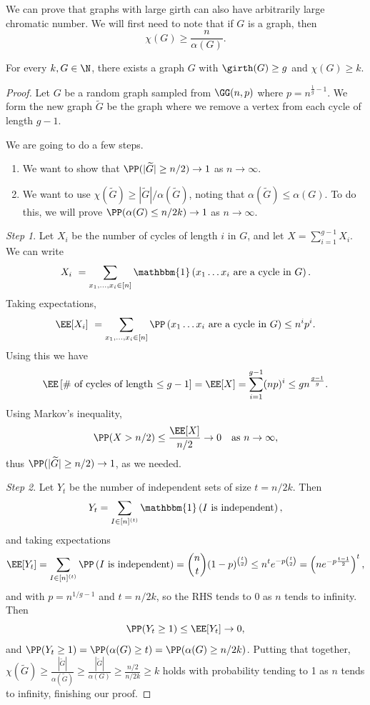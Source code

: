 We can prove that graphs with large girth can also have arbitrarily large chromatic number. We will first need to note that if $G$ is a graph, then
$$
\chi(G) \geq \frac{n}{\alpha(G)}.
$$

\begin{theorem}
	For every $k, G \in \N$, there exists a graph $G$ with $\girth(G) \geq g$ and $\chi(G) \geq k$.
\end{theorem} 
\begin{proof}
	Let $G$ be a random graph sampled from $\GG(n, p)$ where $p = n^{\frac{1}{g} - 1}$. We form the new graph $\widetilde{G}$ be the graph where we remove a vertex from each cycle of length $g - 1$.

	We are going to do a few steps.
	\begin{enumerate}
		\item We want to show that $\PP(|\widetilde{G}| \geq n/2) \rightarrow 1$ as $n \rightarrow \infty$.
		\item We want to use $\chi(\widetilde{G}) \geq |\widetilde{G}|/\alpha(\widetilde{G})$, noting that $\alpha(\widetilde{G}) \leq \alpha(G)$. To do this, we will prove $\PP(\alpha(G) \leq n/2k) \rightarrow 1$ as $n \rightarrow \infty$.
	\end{enumerate}

	\emph{Step 1}. Let $X_i$ be the number of cycles of length $i$ in $G$, and let $X = \sum_{i = 1}^{g - 1} X_i$. We can write
	\begin{align*}
		X_i \ = \sum_{x_1, \dots, x_i \in [n]} \mathbbm{1}\left(x_1 \dots x_i \text{ are a cycle in $G$}\right).
	\end{align*}
	Taking expectations,
	$$
\EE[X_i]\ = \sum_{x_1, \dots, x_i \in [n]} \PP\left(x_1 \dots x_i \text{ are a cycle in $G$}\right) \leq n^i p^i.
	$$
	Using this we have
	$$
	\EE\left[\#\text{ of cycles of length $\leq g - 1$}\right] = \EE[X] = \sum_{i = 1}^{g - 1} (np)^i \leq gn^{\frac{g - 1}{g}}.
	$$
Using Markov's inequality, 
$$
\PP(X > n/2) \leq \frac{\EE[X]}{n/2} \rightarrow 0 \quad \text{as }n \rightarrow \infty,
$$
thus $\PP(|\widetilde{G}| \geq n/2) \rightarrow 1$, as we needed.

\emph{Step 2}. Let $Y_t$ be the number of independent sets of size $t = n/2k$. Then
$$
Y_t = \sum_{I \in [n]^{(t)}} \mathbbm{1}\left(\text{$I$ is independent}\right),
$$
and taking expectations
$$
\EE[Y_t] = \sum_{I \in [n]^{(t)}} \PP\left(\text{$I$ is independent}\right) = \binom{n}{t}(1 - p)^{\binom{t}{2}} \leq n^t e^{-p\binom{t}{2}} = \left(n e^{-p \frac{t - 1}{2}}\right)^t,
$$
and with $p = n^{1/g - 1}$ and $t = n/2k$, so the RHS tends to 0 as $n$ tends to infinity. Then
$$
\PP(Y_t \geq 1) \leq \EE[Y_t] \rightarrow 0,
$$
and $\PP(Y_t \geq 1) = \PP(\alpha(G) \geq t) = \PP(\alpha(G) \geq n/2k)$. Putting that together, $\chi(\widetilde{G}) \geq \frac{|\widetilde{G}|}{\alpha(\widetilde{G})} \geq \frac{|\widetilde{G}|}{\alpha(G)} \geq \frac{n/2}{n/2k} \geq k$ holds with probability tending to 1 as $n$ tends to infinity, finishing our proof.
\end{proof}

